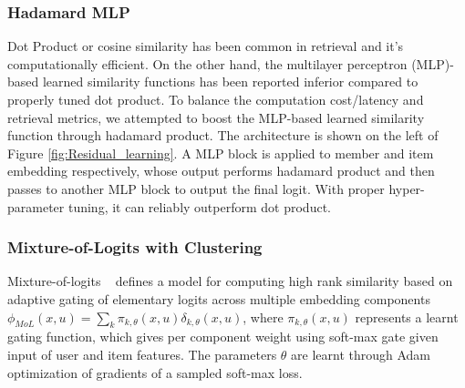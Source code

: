 \subsubsection{Hadamard MLP}
Dot Product or cosine similarity has been common in retrieval and it’s computationally efficient. On the other hand, the multilayer perceptron (MLP)-based learned similarity functions has been reported inferior compared to properly tuned dot product. To balance the computation cost/latency and retrieval metrics, we attempted to boost the MLP-based learned similarity function through hadamard product. The architecture is shown on the left of Figure \ref{fig:Residual_learning}. A MLP block is applied to member and item embedding respectively, whose output performs hadamard product and then passes to another MLP block to output the final logit. With proper hyper-parameter tuning, it can reliably outperform dot product.

\subsubsection{Mixture-of-Logits with Clustering}
Mixture-of-logits ~\cite{MoL_paper} defines a model for computing high rank similarity based on adaptive gating of elementary logits across multiple embedding components $\phi_{MoL}(x, u) = \sum\limits_k \pi_{k,\theta}(x, u) \delta_{k,\theta}(x, u)$, where $\pi_{k,\theta}(x, u)$ represents a learnt gating function, which gives per component weight using soft-max gate given input of user and item features. The parameters $\theta$ are learnt through Adam optimization of gradients of a sampled soft-max loss. 

